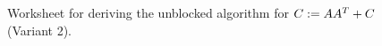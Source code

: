 \documentclass{article}
\begin{document}
\begin{figure}[tbp]

\begin{center}     %
\footnotesize      %
 
\worksheet         %
\end{center} 
 
 
\caption{ Worksheet for deriving the unblocked algorithm for 
$C := A A^T + C$ (Variant 2).} 
 
 
 
\label{FLA_Syrk_ln:ws_unb_var2} 
 
\end{figure} 




\renewcommand{\partitionings}{
  $
  A \rightarrow
  \FlaTwoByOne{A_{T}}
              {A_{B}}
  $
,
  $
  C \rightarrow
  \FlaTwoByTwo{C_{TL}}{C_{TR}}
              {C_{BL}}{C_{BR}}
  $
}

\renewcommand{\partitionsizes}{
$ A_{T} $ has $ 0 $ rows,
$ C_{TL} $ is $ 0 \times 0 $
}


\renewcommand{\repartitionings}{
$
  \FlaTwoByOne{ A_T }
              { A_B }
\rightarrow
  \FlaThreeByOneB{A_0}
                 {a_1^T}
                 {A_2}
$
,
$
  \FlaTwoByTwo{C_{TL}}{C_{TR}}
              {C_{BL}}{C_{BR}}
  \rightarrow
  \FlaThreeByThreeBR{C_{00}}{c_{01}}{C_{02}}
                    {c_{10}^T}{\gamma_{11}}{c_{12}^T}
                    {C_{20}}{c_{21}}{C_{22}}
$}

\renewcommand{\repartitionsizes}{
$ a_1 $ has $ 1 $ row,
  $ \gamma_{11} $ is $ 1 \times 1 $
}


\renewcommand{\moveboundaries}{
$
  \FlaTwoByOne{ A_T }
              { A_B }
\leftarrow
  \FlaThreeByOneT{A_0}
                 {a_1^T}
                 {A_2}
$
,
$
  \FlaTwoByTwo{C_{TL}}{C_{TR}}
              {C_{BL}}{C_{BR}}
  \leftarrow
  \FlaThreeByThreeTL{C_{00}}{c_{01}}{C_{02}}
                    {c_{10}^T}{\gamma_{11}}{c_{12}^T}
                    {C_{20}}{c_{21}}{C_{22}}
$}
\end{document}
